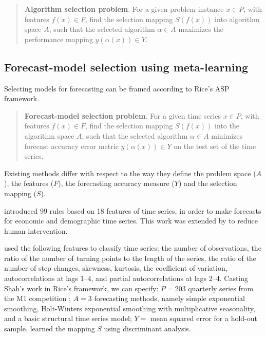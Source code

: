 \documentclass[11pt,a4paper,]{article}
\begin{document}
\begin{quote}
\textbf{Algorithm selection problem}. For a given problem instance \(x \in P\), with features \(f(x) \in F\), find the selection mapping \(S(f(x))\) into algorithm space \(A\), such that the selected algorithm \(\alpha \in A\) maximizes the performance mapping \(y(\alpha(x)) \in Y\).
\end{quote}

\hypertarget{forecast-model-selection-using-meta-learning}{%
\subsection{Forecast-model selection using meta-learning}\label{forecast-model-selection-using-meta-learning}}

Selecting models for forecasting can be framed according to Rice's ASP framework.

\begin{quote}
\textbf{Forecast-model selection problem}. For a given time series \(x \in P\), with features \(f(x) \in F\), find the selection mapping \(S(f(x))\) into the algorithm space \(A\), such that the selected algorithm \(\alpha \in A\) minimizes forecast accuracy error metric \(y(\alpha(x)) \in Y\) on the test set of the time series.
\end{quote}

Existing methods differ with respect to the way they define the problem space (\(A\)), the features (\(F\)), the forecasting accuracy measure (\(Y\)) and the selection mapping (\(S\)).

\textcite{collopy1992rule} introduced 99 rules based on 18 features of time series, in order to make forecasts for economic and demographic time series. This work was extended by \textcite{armstrong2001s} to reduce human intervention.

\textcite{shah1997model} used the following features to classify time series: the number of observations, the ratio of the number of turning points to the length of the series, the ratio of the number of step changes, skewness, kurtosis, the coefficient of variation, autocorrelations at lags 1--4, and partial autocorrelations at lags 2--4. Casting Shah's work in Rice's framework, we can specify: \(P=203\) quarterly series from the M1 competition \autocite{makridakis1982accuracy}; \(A=3\) forecasting methods, namely simple exponential smoothing, Holt-Winters exponential smoothing with multiplicative seasonality, and a basic structural time series model; \(Y=\) mean squared error for a hold-out sample. \textcite{shah1997model} learned the mapping \(S\) using discriminant analysis.
\end{document}
